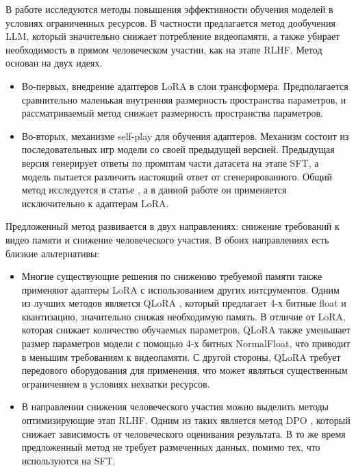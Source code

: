\documentclass[12pt, twoside]{article}
\begin{document}
В работе исследуются методы повышения эффективности обучения моделей в условиях ограниченных ресурсов. В частности предлагается метод дообучения LLM, который значительно снижает потребление видеопамяти, а также убирает необходимость в прямом человеческом участии, как на этапе RLHF. Метод основан на двух идеях. 

\begin{itemize}
  \item Во-первых, внедрение адаптеров LoRA в слои трансформера. Предполагается сравнительно маленькая внутренняя размерность пространства параметров, и рассматриваемый метод снижает размерность пространства параметров. 
  
  \vspace{8}
   
  \item Во-вторых, механизме self-play для обучения адаптеров. Механизм состоит из последовательных игр модели со своей предыдущей версией. Предыдущая версия генерирует ответы по промптам части датасета на этапе SFT, а модель пытается различить настоящий ответ от сгенерированного. Общий метод исследуется в статье \parencite{Chen2024a}, а  в данной работе он применяется исключительно к адаптерам LoRA. 
\end{itemize}

Предложенный метод развивается в двух направлениях: снижение требований к видео памяти и снижение человеческого участия. В обоих направлениях есть близкие альтернативы:

\begin{itemize}
  \item Многие существующие решения по снижению требуемой памяти также применяют адаптеры LoRA с использованием других интсрументов. Одним из лучших методов является QLoRA \parencite{Dettmers2023}, который предлагает 4-х битные float и квантизацию, значительно снижая необходимую память. В отличие от LoRA, которая снижает количество обучаемых параметров, QLoRA также уменьшает размер параметров модели с помощью 4-х битных NormalFloat, что приводит в меньшим требованиям к видеопамяти. С другой стороны, QLoRA требует передового оборудования для применения, что может являться существенным ограничением в условиях нехватки ресурсов. 

  \vspace{8}
  
  \item В направлении снижения человеческого участия можно выделить методы оптимизирующие этап RLHF. Одним из таких является метод DPO \parencite{Rafailov2023a}, который снижает зависимость от человеческого оценивания результата. В то же время предложенный метод не требует размеченных данных, помимо тех, что используются на SFT.
\end{itemize}
\end{document}
